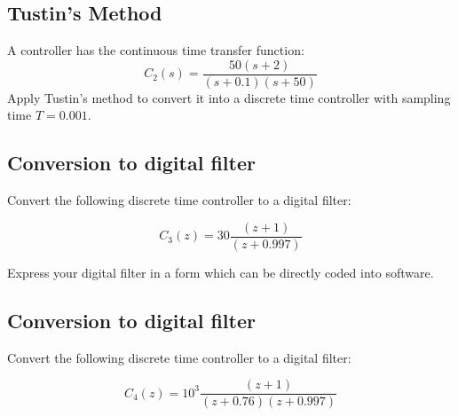 \documentclass{article}	%
\begin{document}
\subsection{Tustin's Method}


A controller has the continuous time transfer function:
\[
C_2(s) = \frac{50(s+2)}{(s+0.1)(s+50)}
\]
Apply Tustin's method to convert it into a discrete time controller with sampling time $T=0.001$.

%
%



\subsection{Conversion to digital filter}


Convert the following discrete time controller to a digital filter:

\[
C_3(z) = 30\frac{(z+1)}{(z+0.997)}
\]

Express your digital filter in a form which can be directly coded into software.


%


\subsection{Conversion to digital filter}


Convert the following discrete time controller to a digital filter:

\[
C_4(z) = 10^3\frac{(z+1)}{(z+0.76)(z+0.997)}
\]



%
%
%
\end{document}
